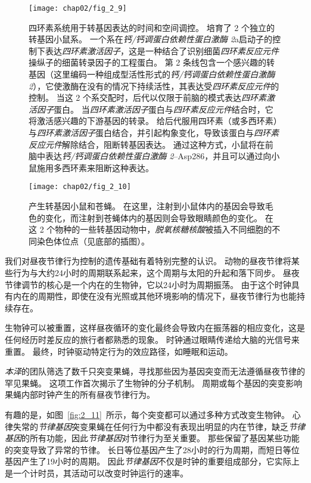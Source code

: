 \begin{figure}[htbp]
	\centering
	\texttt{[image: chap02/fig\_2\_9]}
	\caption{四环素系统用于转基因表达的时间和空间调控。
		培育了 2 个独立的转基因小鼠系。
		一个系在\textit{钙/钙调蛋白依赖性蛋白激酶 2}a启动子的控制下表达\textit{四环素激活因子}，这是一种结合了识别细菌\textit{四环素反应元件}操纵子的细菌转录因子的工程蛋白。
		第 2 条线包含一个感兴趣的转基因（这里编码一种组成型活性形式的\textit{钙/钙调蛋白依赖性蛋白激酶 2}），它使激酶在没有的情况下持续活性，其表达受\textit{四环素反应元件}的控制。
		当这 2 个系交配时，后代以仅限于前脑的模式表达\textit{四环素激活因子}蛋白。
		当\textit{四环素激活因子}蛋白与\textit{四环素反应元件}结合时，它将激活感兴趣的下游基因的转录。
		给后代服用四环素（或多西环素）与\textit{四环素激活因子}蛋白结合，并引起构象变化，导致该蛋白与\textit{四环素反应元件}解除结合，阻断转基因表达。
		通过这种方式，小鼠将在前脑中表达\textit{钙/钙调蛋白依赖性蛋白激酶 2}–Asp286，并且可以通过向小鼠施用多西环素来阻断这种表达\cite{mayford1996control}。}
	\label{fig:2_9}
\end{figure}


\begin{figure}[htbp]
	\centering
	\texttt{[image: chap02/fig\_2\_10]}
	\caption{产生转基因小鼠和苍蝇。
		在这里，注射到小鼠体内的基因会导致毛色的变化，而注射到苍蝇体内的基因则会导致眼睛颜色的变化。
		在这 2 个物种的一些转基因动物中，\textit{脱氧核糖核酸}被插入不同细胞的不同染色体位点（见底部的插图）\cite{alberts2017molecular}。}
	\label{fig:2_10}
\end{figure}




我们对昼夜节律行为控制的遗传基础有着特别完整的认识。
动物的昼夜节律将某些行为与大约24小时的周期联系起来，这个周期与太阳的升起和落下同步。
昼夜节律调节的核心是一个内在的生物钟，它以24小时为周期振荡。
由于这个时钟具有内在的周期性，即使在没有光照或其他环境影响的情况下，昼夜节律行为也能持续存在。



生物钟可以被重置，这样昼夜循环的变化最终会导致内在振荡器的相应变化，这是任何经历时差反应的旅行者都熟悉的现象。
时钟通过眼睛传递给大脑的光信号来重置。
最终，时钟驱动特定行为的效应路径，如睡眠和运动。


\textit{本泽}的团队筛选了数千只突变果蝇，寻找那些因为基因突变而无法遵循昼夜节律的罕见果蝇。
这项工作首次揭示了生物钟的分子机制。
周期或每个基因的突变影响果蝇内部时钟产生的所有昼夜节律行为。


有趣的是，如图~\ref{fig:2_11}~所示，每个突变都可以通过多种方式改变生物钟。
心律失常的\textit{节律基因}突变果蝇在任何行为中都没有表现出明显的内在节律，缺乏\textit{节律基因}的所有功能，因此\textit{节律基因}对节律行为至关重要。
那些保留了基因某些功能的突变导致了异常的节律。
长日等位基因产生了28小时的行为周期，而短日等位基因产生了19小时的周期。
因此\textit{节律基因}不仅是时钟的重要组成部分，它实际上是一个计时员，其活动可以改变时钟运行的速率。


